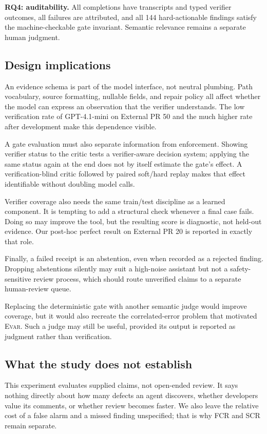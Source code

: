 \documentclass[acmsmall,screen,review,anonymous]{acmart}
\newcommand{\evar}{\textsc{Evar}\xspace}
\begin{document}
\textbf{RQ4: auditability.} All completions have transcripts and typed verifier outcomes, all failures are attributed, and all 144 hard-actionable findings satisfy the machine-checkable gate invariant. Semantic relevance remains a separate human judgment.

\subsection{Design implications}

An evidence schema is part of the model interface, not neutral plumbing. Path vocabulary, source formatting, nullable fields, and repair policy all affect whether the model can express an observation that the verifier understands. The low verification rate of GPT-4.1-mini on External PR 50 and the much higher rate after development make this dependence visible.

A gate evaluation must also separate information from enforcement. Showing verifier status to the critic tests a verifier-aware decision system; applying the same status again at the end does not by itself estimate the gate's effect. A verification-blind critic followed by paired soft/hard replay makes that effect identifiable without doubling model calls.

Verifier coverage also needs the same train/test discipline as a learned component. It is tempting to add a structural check whenever a final case fails. Doing so may improve the tool, but the resulting score is diagnostic, not held-out evidence. Our post-hoc perfect result on External PR 20 is reported in exactly that role.

Finally, a failed receipt is an abstention, even when recorded as a rejected finding. Dropping abstentions silently may suit a high-noise assistant but not a safety-sensitive review process, which should route unverified claims to a separate human-review queue.

Replacing the deterministic gate with another semantic judge would improve coverage, but it would also recreate the correlated-error problem that motivated \evar. Such a judge may still be useful, provided its output is reported as judgment rather than verification.

\subsection{What the study does not establish}

This experiment evaluates supplied claims, not open-ended review. It says nothing directly about how many defects an agent discovers, whether developers value its comments, or whether review becomes faster. We also leave the relative cost of a false alarm and a missed finding unspecified; that is why FCR and SCR remain separate.
\end{document}
